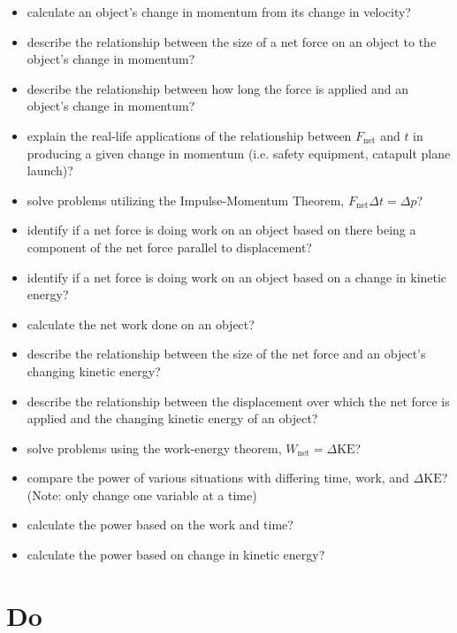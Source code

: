 \documentclass[]{exam}
\begin{document}
\begin{itemize}[itemsep=0pt,topsep=2pt]
    \item calculate an object's change in momentum from its change in velocity?
    \item describe the relationship between the size of a net force on an object to the object’s change in momentum?
    \item describe the relationship between how long the force is applied and an object’s change in momentum?
    \item explain the real-life applications of the relationship between $F_\text{net}$ and $t$ in producing a given change in momentum (i.e. safety equipment, catapult plane launch)?
    \item solve problems utilizing the Impulse-Momentum Theorem, $F_\text{net} \Delta t = \Delta p$?
    \item identify if a net force is doing work on an object based on there being a component of the net force parallel to displacement?
    \item identify if a net force is doing work on an object based on a change in kinetic energy?
    \item calculate the net work done on an object?
    \item describe the relationship between the size of the net force and an object's changing kinetic energy?
    \item describe the relationship between the displacement over which the net force is applied and the changing kinetic energy of an object?
    \item solve problems using the work-energy theorem, $W_\text{net} = \Delta \mathrm{KE}$?
    \item compare the power of various situations with differing time, work, and $\Delta \mathrm{KE}$? (Note: only change one variable at a time)
    \item calculate the power based on the work and time?
    \item calculate the power based on change in kinetic energy?
\end{itemize}

\section*{Do}
\end{document}
